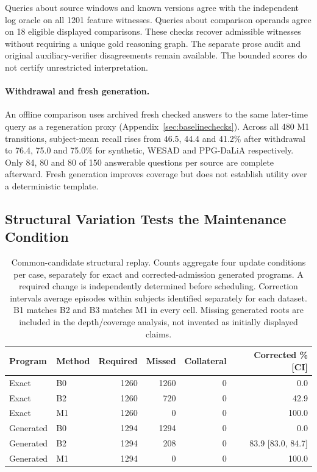 \documentclass[runningheads]{llncs}
\newcommand{\SemCompetencyWitnesses}{1201}
\newcommand{\SemCompetencyComparisons}{18}
\begin{document}
Queries about source windows and known versions agree with the independent log
oracle on all \SemCompetencyWitnesses{} feature witnesses. Queries about comparison
operands agree on \SemCompetencyComparisons{} eligible displayed comparisons.
These checks recover admissible witnesses without requiring a unique gold
reasoning graph. The separate prose audit and
original auxiliary-verifier disagreements remain available. The bounded scores
do not certify unrestricted interpretation.

\paragraph{Withdrawal and fresh generation.}
An offline comparison uses archived fresh checked answers to the same later-time
query as a regeneration proxy (Appendix~\ref{sec:baselinechecks}). Across all 480 M1
transitions, subject-mean recall rises from 46.5, 44.4 and 41.2\% after withdrawal
to 76.4, 75.0 and 75.0\% for synthetic, WESAD and PPG-DaLiA respectively.
Only 84, 80 and 80 of
150 answerable questions per source are complete afterward. Fresh generation
improves coverage but does not establish utility over a deterministic template.

\subsection{Structural Variation Tests the Maintenance Condition}






\begin{table}[!htbp]
\caption{Common-candidate structural replay. Counts aggregate four update conditions
per case, separately for exact and corrected-admission generated programs. A required change is
independently determined before scheduling. Correction intervals average episodes
within subjects identified separately for each dataset. B1 matches B2 and B3 matches M1 in every cell.
Missing generated roots are included in the depth/coverage analysis, not invented
as initially displayed claims.}
\label{tab:structural}
\centering\small\setlength{\tabcolsep}{4pt}
\begin{tabular}{llrrrr}
\toprule
Program & Method & Required & Missed & Collateral & Corrected \% [CI] \\
\midrule
Exact & B0 & 1260 & 1260 & 0 & 0.0 \\
Exact & B2 & 1260 & 720 & 0 & 42.9 \\
Exact & M1 & 1260 & 0 & 0 & 100.0 \\
Generated & B0 & 1294 & 1294 & 0 & 0.0 \\
Generated & B2 & 1294 & 208 & 0 & 83.9 [83.0, 84.7] \\
Generated & M1 & 1294 & 0 & 0 & 100.0 \\
\bottomrule
\end{tabular}
\space%
 \end{table}
\end{document}
